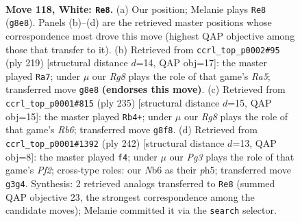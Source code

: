 \documentclass[11pt]{article}
\begin{document}
\clearpage

\begin{figure}[p]\centering
\begin{subfigure}{0.46\textwidth}\centering
\resizebox{\linewidth}{!}{%
\newchessgame
\chessboard[
  setfen={6R1/6p1/1N3pk1/7p/7P/6PK/r7/8 w - - 60 118},
  showmover=false,
  pgfstyle=straightmove, color=movearrow, markmove={g8-e8}
]}
\caption{}
\end{subfigure}\hfill
\begin{subfigure}{0.46\textwidth}\centering
\resizebox{\linewidth}{!}{%
\newchessgame
\chessboard[
  setfen={6k1/5p2/4pP2/4P2R/r3PK2/8/8/8 b - - 36 110},
  showmover=false,
  pgfstyle=straightmove, color=movearrow, markmove={a4-a7}
]}
\caption{}
\end{subfigure}
\\[4pt]
\begin{subfigure}{0.46\textwidth}\centering
\resizebox{\linewidth}{!}{%
\newchessgame
\chessboard[
  setfen={8/5pk1/5p2/2R4P/5KP1/1r3P2/8/8 b - - 70 118},
  showmover=false,
  pgfstyle=straightmove, color=movearrow, markmove={b3-b4}
]}
\caption{}
\end{subfigure}\hfill
\begin{subfigure}{0.46\textwidth}\centering
\resizebox{\linewidth}{!}{%
\newchessgame
\chessboard[
  setfen={8/8/1R4pk/5p1p/7P/6P1/5PK1/r7 w - - 20 122},
  showmover=false,
  pgfstyle=straightmove, color=movearrow, markmove={f2-f4}
]}
\caption{}
\end{subfigure}
\caption{\textbf{Move 118, White: \texttt{Re8}.} (a) Our position; Melanie plays \texttt{Re8} (\texttt{g8e8}). Panels (b)--(d) are the retrieved master positions whose correspondence most drove this move (highest QAP objective among those that transfer to it). (b) Retrieved from \texttt{ccrl\_top\_p0002\#95} (ply 219) [structural distance $d$=14, QAP obj=17]: the master played \texttt{Ra7}; under $\mu$ our \emph{Rg8} plays the role of that game's \emph{Ra5}; transferred move \texttt{g8e8} \textbf{(endorses this move)}. (c) Retrieved from \texttt{ccrl\_top\_p0001\#815} (ply 235) [structural distance $d$=15, QAP obj=15]: the master played \texttt{Rb4+}; under $\mu$ our \emph{Rg8} plays the role of that game's \emph{Rb6}; transferred move \texttt{g8f8}. (d) Retrieved from \texttt{ccrl\_top\_p0001\#1392} (ply 242) [structural distance $d$=13, QAP obj=8]: the master played \texttt{f4}; under $\mu$ our \emph{Pg3} plays the role of that game's \emph{Pf2}; cross-type roles: our \emph{N}b6 as their \emph{p}h5; transferred move \texttt{g3g4}. Synthesis: 2 retrieved analogs transferred to \texttt{Re8} (summed QAP objective 23, the strongest correspondence among the candidate moves); Melanie committed it via the \texttt{search} selector.}
\label{fig:thought-m234}
\end{figure}
\end{document}
